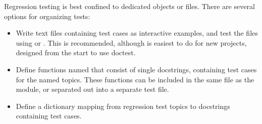 Regression testing is best confined to dedicated objects or files.  There
are several options for organizing tests:

\begin{itemize}
\item Write text files containing test cases as interactive examples,
      and test the files using  or
      .  This is recommended, although is
      easiest to do for new projects, designed from the start to use
      doctest.
\item Define functions named  that
      consist of single docstrings, containing test cases for the
      named topics.  These functions can be included in the same file
      as the module, or separated out into a separate test file.
\item Define a  dictionary mapping from regression test
      topics to docstrings containing test cases.
\end{itemize}
